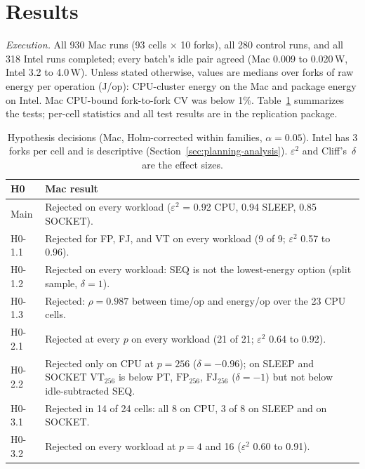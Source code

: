 \section{Results}\label{sec:results}
\emph{Execution.} All 930 Mac runs (93 cells $\times$ 10 forks), all 280 control runs, and all 318 Intel runs completed; every batch's idle pair agreed (Mac 0.009 to 0.020\,W, Intel 3.2 to 4.0\,W). Unless stated otherwise, values are medians over forks of raw energy per operation (J/op): CPU-cluster energy on the Mac and package energy on Intel. Mac CPU-bound fork-to-fork CV was below 1\%. Table~\ref{tab:hyp-results} summarizes the tests; per-cell statistics and all test results are in the replication package.

\begin{table}[tb]
\caption{Hypothesis decisions (Mac, Holm-corrected within families, $\alpha = 0.05$). Intel has 3 forks per cell and is descriptive (Section~\ref{sec:planning-analysis}). $\varepsilon^2$ and Cliff's~$\delta$ are the effect sizes.}
\label{tab:hyp-results}
\scriptsize
\setlength{\tabcolsep}{2.5pt}
\begin{tabular}{@{}lp{7.1cm}@{}}
\toprule
H0 & Mac result \\
\midrule
Main & Rejected on every workload ($\varepsilon^2$ = 0.92 CPU, 0.94 SLEEP, 0.85 SOCKET). \\
H0-1.1 & Rejected for FP, FJ, and VT on every workload (9 of 9; $\varepsilon^2$ 0.57 to 0.96). \\
H0-1.2 & Rejected on every workload: SEQ is not the lowest-energy option (split sample, $\delta = 1$). \\
H0-1.3 & Rejected: $\rho = 0.987$ between time/op and energy/op over the 23 CPU cells. \\
H0-2.1 & Rejected at every $p$ on every workload (21 of 21; $\varepsilon^2$ 0.64 to 0.92). \\
H0-2.2 & Rejected only on CPU at $p = 256$ ($\delta = -0.96$); on SLEEP and SOCKET $\mathrm{VT}_{256}$ is below PT, $\mathrm{FP}_{256}$, $\mathrm{FJ}_{256}$ ($\delta = -1$) but not below idle-subtracted SEQ. \\
H0-3.1 & Rejected in 14 of 24 cells: all 8 on CPU, 3 of 8 on SLEEP and on SOCKET. \\
H0-3.2 & Rejected on every workload at $p = 4$ and 16 ($\varepsilon^2$ 0.60 to 0.91). \\
\bottomrule
\end{tabular}
\end{table}

